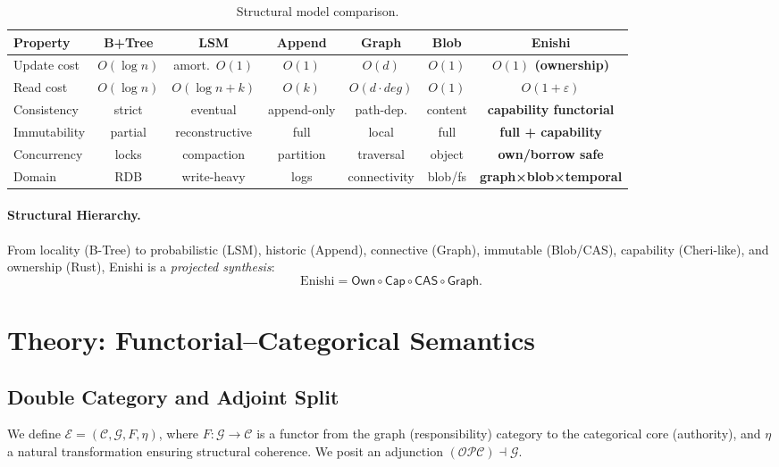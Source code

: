 \documentclass[10pt]{article}
\begin{document}
\begin{table}[h]
\centering
\small
\begin{tabularx}{\linewidth}{l C C C C C C}
\toprule
Property & B+Tree & LSM & Append & Graph & Blob & \textbf{Enishi} \\
\midrule
Update cost & $O(\log n)$ & amort.\ $O(1)$ & $O(1)$ & $O(d)$ & $O(1)$ & \textbf{$O(1)$ (ownership)} \\
Read cost & $O(\log n)$ & $O(\log n{+}k)$ & $O(k)$ & $O(d\cdot deg)$ & $O(1)$ & \textbf{$O(1{+}\varepsilon)$} \\
Consistency & strict & eventual & append-only & path-dep. & content & \textbf{capability functorial} \\
Immutability & partial & reconstructive & full & local & full & \textbf{full + capability} \\
Concurrency & locks & compaction & partition & traversal & object & \textbf{own/borrow safe} \\
Domain & RDB & write-heavy & logs & connectivity & blob/fs & \textbf{graph×blob×temporal} \\
\bottomrule
\end{tabularx}
\caption{Structural model comparison.}
\label{tab:model}
\end{table}

\paragraph{Structural Hierarchy.}
From locality (B-Tree) to probabilistic (LSM), historic (Append), connective (Graph),
immutable (Blob/CAS), capability (Cheri-like), and ownership (Rust), Enishi is a \emph{projected synthesis}:
\[
\text{Enishi} = \mathsf{Own} \circ \mathsf{Cap} \circ \mathsf{CAS} \circ \mathsf{Graph}.
\]

\section{Theory: Functorial--Categorical Semantics}
\subsection{Double Category and Adjoint Split}
We define $\mathcal{E} = (\mathcal{C},\mathcal{G},F,\eta)$, where
$F:\mathcal{G}\to\mathcal{C}$ is a functor from the graph (responsibility) category to the categorical core (authority),
and $\eta$ a natural transformation ensuring structural coherence. We posit an adjunction
$(\mathcal{O}\mathcal{P}\mathcal{C}) \dashv \mathcal{G}$.
\end{document}
